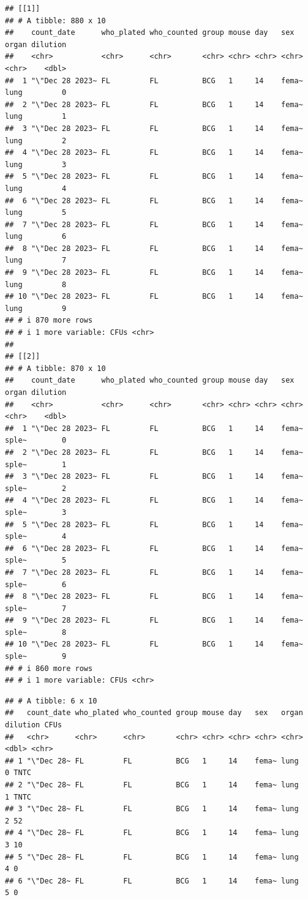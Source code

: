 \documentclass[
]{book}
\begin{document}
\begin{verbatim}
## [[1]]
## # A tibble: 880 x 10
##    count_date      who_plated who_counted group mouse day   sex   organ dilution
##    <chr>           <chr>      <chr>       <chr> <chr> <chr> <chr> <chr>    <dbl>
##  1 "\"Dec 28 2023~ FL         FL          BCG   1     14    fema~ lung         0
##  2 "\"Dec 28 2023~ FL         FL          BCG   1     14    fema~ lung         1
##  3 "\"Dec 28 2023~ FL         FL          BCG   1     14    fema~ lung         2
##  4 "\"Dec 28 2023~ FL         FL          BCG   1     14    fema~ lung         3
##  5 "\"Dec 28 2023~ FL         FL          BCG   1     14    fema~ lung         4
##  6 "\"Dec 28 2023~ FL         FL          BCG   1     14    fema~ lung         5
##  7 "\"Dec 28 2023~ FL         FL          BCG   1     14    fema~ lung         6
##  8 "\"Dec 28 2023~ FL         FL          BCG   1     14    fema~ lung         7
##  9 "\"Dec 28 2023~ FL         FL          BCG   1     14    fema~ lung         8
## 10 "\"Dec 28 2023~ FL         FL          BCG   1     14    fema~ lung         9
## # i 870 more rows
## # i 1 more variable: CFUs <chr>
## 
## [[2]]
## # A tibble: 870 x 10
##    count_date      who_plated who_counted group mouse day   sex   organ dilution
##    <chr>           <chr>      <chr>       <chr> <chr> <chr> <chr> <chr>    <dbl>
##  1 "\"Dec 28 2023~ FL         FL          BCG   1     14    fema~ sple~        0
##  2 "\"Dec 28 2023~ FL         FL          BCG   1     14    fema~ sple~        1
##  3 "\"Dec 28 2023~ FL         FL          BCG   1     14    fema~ sple~        2
##  4 "\"Dec 28 2023~ FL         FL          BCG   1     14    fema~ sple~        3
##  5 "\"Dec 28 2023~ FL         FL          BCG   1     14    fema~ sple~        4
##  6 "\"Dec 28 2023~ FL         FL          BCG   1     14    fema~ sple~        5
##  7 "\"Dec 28 2023~ FL         FL          BCG   1     14    fema~ sple~        6
##  8 "\"Dec 28 2023~ FL         FL          BCG   1     14    fema~ sple~        7
##  9 "\"Dec 28 2023~ FL         FL          BCG   1     14    fema~ sple~        8
## 10 "\"Dec 28 2023~ FL         FL          BCG   1     14    fema~ sple~        9
## # i 860 more rows
## # i 1 more variable: CFUs <chr>
\end{verbatim}

\begin{verbatim}
## # A tibble: 6 x 10
##   count_date who_plated who_counted group mouse day   sex   organ dilution CFUs 
##   <chr>      <chr>      <chr>       <chr> <chr> <chr> <chr> <chr>    <dbl> <chr>
## 1 "\"Dec 28~ FL         FL          BCG   1     14    fema~ lung         0 TNTC 
## 2 "\"Dec 28~ FL         FL          BCG   1     14    fema~ lung         1 TNTC 
## 3 "\"Dec 28~ FL         FL          BCG   1     14    fema~ lung         2 52   
## 4 "\"Dec 28~ FL         FL          BCG   1     14    fema~ lung         3 10   
## 5 "\"Dec 28~ FL         FL          BCG   1     14    fema~ lung         4 0    
## 6 "\"Dec 28~ FL         FL          BCG   1     14    fema~ lung         5 0
\end{verbatim}
\end{document}
